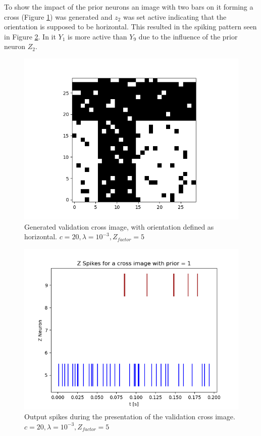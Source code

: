 To show the impact of the prior neurons an image with two bars on it forming a cross (Figure \ref{fig:horvertValidationCross}) was generated and $z_2$ was set active indicating that the orientation is supposed to be horizontal. This resulted in the spiking pattern seen in Figure \ref{fig:horvert_c20_3_Zfactor5_crossZSpikes}. In it $Y_1$ is more active than $Y_9$ due to the influence of the prior neuron $Z_2$.

\begin{figure}
  \includegraphics[width=\linewidth]{figures/horvert/horvert_c20_3_Zfactor5_validationCross.png}
  \caption{Generated validation cross image, with orientation defined as horizontal. $c = 20, \lambda = 10^{-3}, Z_{factor} = 5$}
  \label{fig:horvertValidationCross}
\end{figure}

\begin{figure}
  \includegraphics[width=\linewidth]{figures/horvert/horvert_c20_3_Zfactor5_crossZSpikes.png}
  \caption{Output spikes during the presentation of the validation cross image. $c = 20, \lambda = 10^{-3}, Z_{factor} = 5$}
  \label{fig:horvert_c20_3_Zfactor5_crossZSpikes}
\end{figure}

\fi